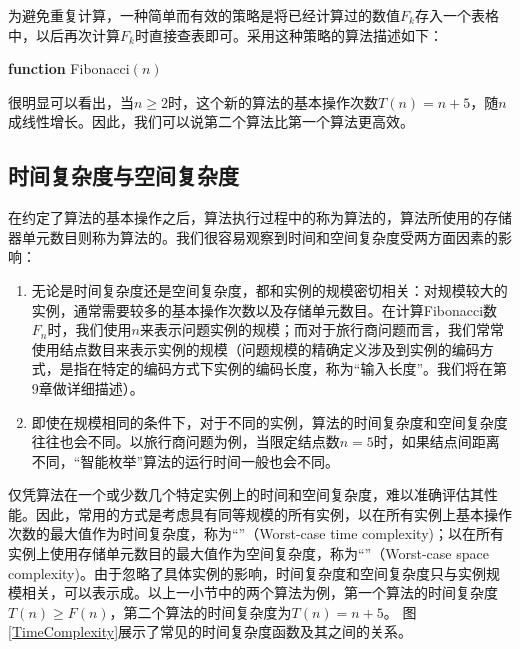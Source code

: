 为避免重复计算，一种简单而有效的策略是将已经计算过的数值$F_k$存入一个表格中，以后再次计算$F_k$时直接查表即可。采用这种策略的算法描述如下：
\begin{algorithm}[H]
\caption{Calculation of Fibonacci number}\label{Fibonacci2}
{\bf function} {\sc Fibonacci}{$(n)$}
\begin{algorithmic}[1]
	\ENDIF
	\ENDFOR
\end{algorithmic}
\end{algorithm}	
很明显可以看出，当$n\geq 2$时，这个新的算法的基本操作次数$T(n)=n+5$，随$n$成线性增长。因此，我们可以说第二个算法比第一个算法更高效。

\subsection{时间复杂度与空间复杂度}
 	在约定了算法的基本操作之后，算法执行过程中的称为算法的，算法所使用的存储器单元数目则称为算法的。我们很容易观察到时间和空间复杂度受两方面因素的影响：
	\begin{enumerate}[(1)] 
		\item 无论是时间复杂度还是空间复杂度，都和实例的规模密切相关：对规模较大的实例，通常需要较多的基本操作次数以及存储单元数目。在计算Fibonacci数$F_n$时，我们使用$n$来表示问题实例的规模；而对于旅行商问题而言，我们常常使用结点数目来表示实例的规模（问题规模的精确定义涉及到实例的编码方式，是指在特定的编码方式下实例的编码长度，称为“输入长度”。我们将在第9章做详细描述）。
		\item 即使在规模相同的条件下，对于不同的实例，算法的时间复杂度和空间复杂度往往也会不同。以旅行商问题为例，当限定结点数$n=5$时，如果结点间距离不同，“智能枚举”算法的运行时间一般也会不同。
	\end{enumerate}	
	
        仅凭算法在一个或少数几个特定实例上的时间和空间复杂度，难以准确评估其性能。因此，常用的方式是考虑具有同等规模的所有实例，以在所有实例上基本操作次数的最大值作为时间复杂度，称为“”（Worst-case time complexity)；以在所有实例上使用存储单元数目的最大值作为空间复杂度，称为“”（Worst-case space complexity)。由于忽略了具体实例的影响，时间复杂度和空间复杂度只与实例规模相关，可以表示成。以上一小节中的两个算法为例，第一个算法的时间复杂度$T(n)\geq F(n)$，第二个算法的时间复杂度为$T(n) = n+5$。	图\ref{TimeComplexity}展示了常见的时间复杂度函数及其之间的关系。

